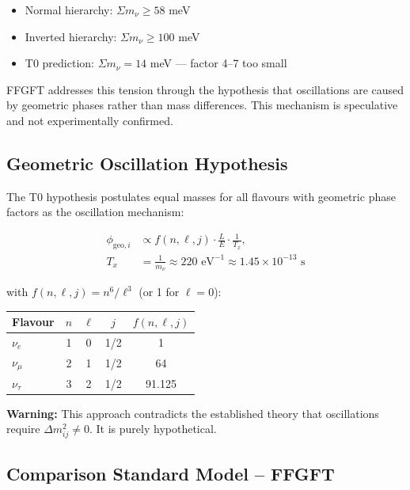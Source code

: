 	\begin{itemize}
		\item Normal hierarchy: \(\Sigma m_\nu \geq 58\) meV
		\item Inverted hierarchy: \(\Sigma m_\nu \geq 100\) meV
		\item T0 prediction: \(\Sigma m_\nu = 14\) meV --- factor 4--7 too small
	\end{itemize}
	
	FFGFT addresses this tension through the hypothesis that oscillations are caused by geometric phases rather than mass differences. This mechanism is speculative and not experimentally confirmed.
	
	\subsection*{Geometric Oscillation Hypothesis}
	
	The T0 hypothesis postulates equal masses for all flavours with geometric phase factors as the oscillation mechanism:
	
\begin{equation}
	\begin{aligned}
		\phi_{\text{geo}, i} 
		&\propto f(n, \ell, j) \cdot \frac{L}{E} \cdot \frac{1}{T_x}, \\
		T_x &= \frac{1}{m_\nu} 
		\approx 220\text{ eV}^{-1} 
		\approx 1.45 \times 10^{-13}\text{ s}
	\end{aligned}
\end{equation}
	
	with \(f(n,\ell,j) = n^6/\ell^3\) (or 1 for \(\ell = 0\)):
	
	\begin{center}
		\small
		\begin{tabular}{lcccc}
			\textbf{Flavour} & \(n\) & \(\ell\) & \(j\) & \(f(n,\ell,j)\) \\
			\hline
			\(\nu_e\) & 1 & 0 & 1/2 & 1 \\
			\(\nu_\mu\) & 2 & 1 & 1/2 & 64 \\
			\(\nu_\tau\) & 3 & 2 & 1/2 & 91.125 \\
		\end{tabular}
	\end{center}
	
	\textbf{Warning:} This approach contradicts the established theory that oscillations require \(\Delta m^2_{ij} \neq 0\). It is purely hypothetical.
	
	\subsection*{Comparison Standard Model -- FFGFT}
	
